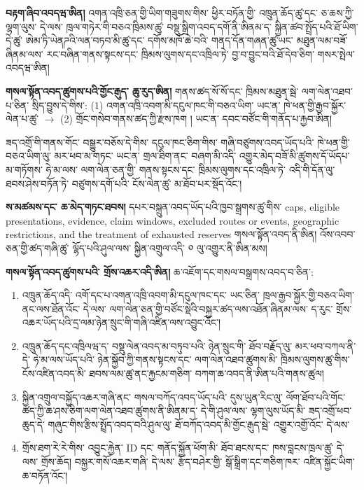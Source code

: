 \documentclass[11pt]{article}
\begin{document}
\textbf{བརྟག་ཞིབ་འབདཝ་ཨིན།} འགན་འཁྲི་ཅན་གྱི་ཡིག་གཟུགས་གིས་ ཕྱིར་བཏོན་གྱི་ འཁྲུན་ཆོད་ཚུ་དང་ ཅ་ཆས་ཀྱི་ལྷག་ལུས་ དེ་ལས་ ཁྲལ་གཏེར་གི་བཅའ་ཁྲིམས་ཚུ་ བསྡུ་སྒྲིག་འབད་དགོ་ནི་ཨིནམ་ད་ སྐྱིན་ཚབ་སྤྲོད་པའི་ཐོ་ཡིག་དེ་ཚུ་ ཨེམ་ཏི་ཡེནཌའི་ལན་བཏབ་མི་ཚུ་དང་ དགོས་མཁོ་ཆེ་བའི་ གནད་དོན་གཞན་ཚུ་ཡང་ མཐུན་ལམ་བཟོ་ཞིནམ་ལས་ རང་བཞིན་གནས་སྟངས་དང་ ཁྲིམས་ལུགས་དང་འཁྲིལ་ཏེ་ བྱ་བ་བྱུང་བའི་ཐོ་དེབ་ཅིག་ གསར་སྤེལ་འབདཝ་ཨིན།

\textbf{གསལ་སྟོན་འབད་ཚུགས་པའི་གྱོང་རྒུད་ ཆུ་རུད་ཨིན།} གནས་ཚད་སོ་སོ་དང་ ཁྲིམས་མཐུན་སྦེ་ ལག་ལེན་འཐབ་པ་ཅིན་ སྲིད་བྱུས་དེ་གིས་: (1) འགན་འཁྲི་འབག་མི་དངུལ་ཁང་གི་བཅའ་ཡིག་ ཡང་ན་ ཁེ་ཕན་གྱི་རྒྱབ་སྐྱོར་ལེན་པ་ཚུ་ $\to$ (2) གྲོང་གསེབ་གནས་ཚད་ཀྱི་རྫས་ཁག ། ཡང་ན་ དབང་བཙོང་གི་གནོད་པ་རྐྱབ་ཨིན།

ཟད་འགྲོ་གི་གནས་གོང་ བསྒྱུར་བཅོས་དེ་གིས་ དངུལ་ཁང་ཅིག་གིས་ གཞི་བཙུགས་འབད་ཡོད་པའི་ ཁེ་ཕན་གྱི་བཅའ་ཡིག་ལུ་ མར་ཕབ་མ་གཏང་ ཡང་ན་ གྲལ་ཐིག་ནང་ བཞག་མི་འདི་ འགྱུར་མེད་བཟོ་མི་ཚུགས་དོ་ཡོདཔ་མ་གཏོགས་ ཧེ་མ་ལས་ ལག་ལེན་ཅན་གྱི་ གནས་སྟངས་དང་ ཁྲིམས་ལུགས་དང་འཁྲིལ་ཏེ་ འདི་གི་དོན་ལུ་ ཐབས་ཤེས་བཏོན་ཏེ་ བཙུགས་དགོ་པའི་ ངོས་ལེན་ཚུ་ མ་ཐོབ་པར་སྡོད་འོང་།

\textbf{ས་མཚམས་དང་ ཆ་མེད་གཏང་ཐབས།} དཔར་བསྐྲུན་འབད་ཡོད་པའི་ཁྱབ་སྒྲགས་ཚུ་གིས་ caps, eligible presentations, evidence, claim windows, excluded routes or events, geographic restrictions, and the treatment of exhausted reserves གསལ་སྟོན་འབད་ནི་ཨིན། འོས་འབབ་ཅན་གྱི་ཚད་གཞི་ཚུ་ ལྷོད་པའི་ཤུལ་ལས་ སྐྱིན་འགྲུལ་འདི་ ༠ ལུ་འགྱུར་ནི་ཨིན་མས།

\textbf{གསལ་སྟོན་འབད་ཚུགས་པའི་ གྲོས་འཆར་འདི་ཨིན།} ཆ་འཇོག་དང་གསལ་བསྒྲགས་འབད་བ་ཅིན་:

\begin{enumerate}[leftmargin=*]
\item འཁྲུན་ཆོད་འདི་ འགོ་དང་པ་འགན་འཁྲི་འབག་མི་དངུལ་ཁང་དང་ ཡང་ཅིན་ ཁྲལ་རྒྱབ་སྐྱོར་གྱི་བཅའ་ཡིག་ནང་ལས་ཐོན་འོང་ དེ་ལས་ ལག་ལེན་ཅན་གྱི་བཙོང་སྡེའི་བསྐྱར་ཚད་ལས་འཐོན་ཞིནམ་ལས་ ད་རུང་ གྲོས་འཆར་ཡོད་པའི་དྲ་ལམ་ཉེན་སྲུང་གི་གཞི་འཛིན་ལས་འབྱུང་འོང་།
\item འཁྲུན་ཆོད་དང་འཁྲིལཝ་ད་ བསྡུ་ལེན་འབད་མ་བཏུབ་པའི་ ཉེན་སྲུང་གི་ ཐོབ་བརྗོད་ལུ་ མར་ཕབ་བཀལ་ནི་དེ་ ཧེ་མ་ལས་ཡོད་པའི་ ཉེན་སྐྱོབ་ཀྱི་གནས་སྟངས་དང་ ལག་ལེན་འཐབ་ཚུགས་མི་ ཁྲིམས་ལུགས་ཚུ་གིས་ ངོས་འཛིན་འབད་མི་ ཐབས་ལམ་ཚུ་ནང་རྐྱངམ་གཅིག་ བཀག་ཆ་འབད་ནི་ཨིན་པའི་གནས་ཚུལ།
\item སྐྱིན་འགྲུལ་བསྐྱོད་འཆར་གཞི་ནང་ གསལ་བཀོད་འབད་ཡོད་པའི་ དུས་ཡུན་རིང་ལུ་ ལོག་ཐོབ་པའི་གོང་ཚད་ཀྱི་ཆ་ཤས་ཅིག་ལག་ལེན་འཐབ་ཚུགས་ནི་ཨིནམ་ད་ དེ་གི་ཤུལ་ལས་ ལྷག་ལུས་ཡོད་མི་ ཟད་འགྲོ་ཕབ་ཆུད་དེ་ གཞུང་གིས་རྩིས་སྤྲོད་འབད་བའི་ཤུལ་ལུ་ ཐོ་བཀོད་འབད་མི་གྱོང་རྒུད་སྦེ་ འགྱུར་འགྱོ་འོང་ དེ་ལས་
\item གྲོས་ཐག་རེ་རེ་གིས་ འབྱུང་རྐྱེན་ ID དང་ གནོད་སྐྱོན་ཕོག་མི་ ཐོབ་ཐངས་དང་ ཁས་བླངས་ཁྲལ་ཚུ་ དེ་ལས་ གྲོས་ཆོད། བསྐྱར་གསོ་འཆར་གཞི་ དེ་ལས་ རྩོད་བཤེར་གྱི་ སྒོ་སྒྲིག་དང་གཅིག་ཁར་ འཛིན་སྐྱོང་ཡིག་ཆ་བཏོན་འོང་།
\end{enumerate}
\end{document}
